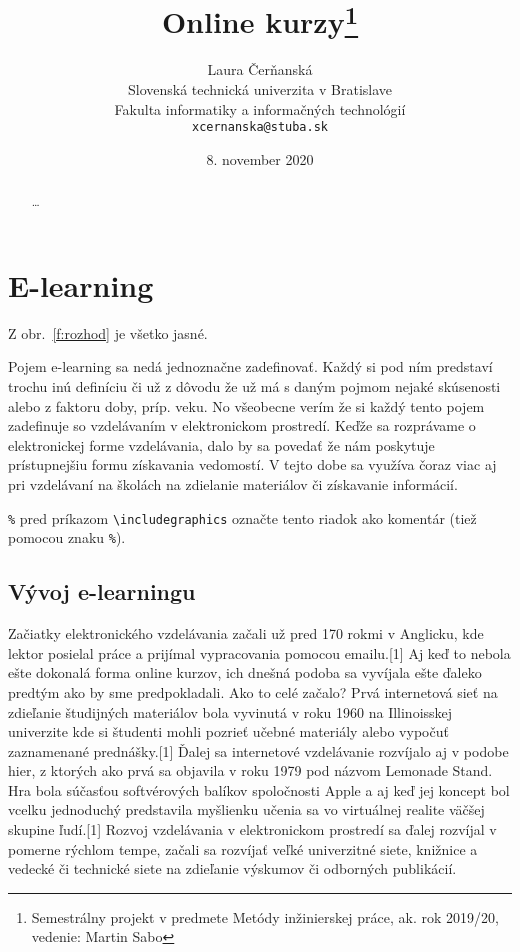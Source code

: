 \documentclass[10pt,twoside,slovak,a4paper]{article}
\title{Online kurzy\thanks{Semestrálny projekt v predmete Metódy inžinierskej práce, ak. rok 2019/20, vedenie: Martin Sabo}}
\author{Laura Čerňanská\\[2pt]
	{\small Slovenská technická univerzita v Bratislave}\\
	{\small Fakulta informatiky a informačných technológií}\\
	{\small \texttt{xcernanska@stuba.sk}}
	}
\date{\small 8. november 2020}
\begin{document}
\maketitle

\begin{abstract}
\ldots
\end{abstract}


\section{E-learning} \label{elearning}

Z obr.~\ref{f:rozhod} je všetko jasné. 

\begin{figure*}[tbh]
\centering
Pojem e-learning sa nedá jednoznačne zadefinovať. Každý si pod ním predstaví trochu inú definíciu či už z dôvodu že už má s daným pojmom nejaké skúsenosti alebo z faktoru doby, príp. veku. No všeobecne verím že si každý tento pojem zadefinuje so vzdelávaním v elektronickom prostredí. Keďže sa rozprávame o elektronickej forme vzdelávania, dalo by sa povedať že nám poskytuje prístupnejšiu formu získavania vedomostí. V tejto dobe sa využíva čoraz viac aj pri vzdelávaní na školách na zdielanie materiálov či získavanie informácií.

\texttt{\%} pred príkazom 
\verb|\includegraphics| označte tento riadok ako komentár (tiež pomocou znaku \texttt{\%}).
\caption{Rozhodujúci argument.}
\label{f:rozhod}
\end{figure*}

\subsection{Vývoj e-learningu} \label{vyvoj}

Začiatky elektronického vzdelávania začali už pred 170 rokmi v Anglicku, kde lektor posielal práce a prijímal vypracovania pomocou emailu.[1] Aj keď to nebola ešte dokonalá forma online kurzov, ich dnešná podoba sa vyvíjala ešte ďaleko predtým ako by sme predpokladali. 
Ako to celé začalo?
Prvá internetová sieť na zdieľanie študijných materiálov bola vyvinutá v roku 1960 na Illinoisskej univerzite kde si študenti mohli pozrieť učebné materiály alebo vypočuť zaznamenané prednášky.[1]
Ďalej sa internetové vzdelávanie rozvíjalo aj v podobe hier, z ktorých ako prvá sa objavila v roku 1979 pod názvom Lemonade Stand. Hra bola súčasťou softvérových balíkov spoločnosti Apple a aj keď jej koncept bol vcelku jednoduchý predstavila myšlienku učenia sa vo virtuálnej realite väčšej skupine ľudí.[1]
Rozvoj vzdelávania v elektronickom prostredí sa ďalej rozvíjal v pomerne rýchlom tempe, začali sa rozvíjať veľké univerzitné siete, knižnice a vedecké či technické siete na zdieľanie výskumov či odborných publikácií.
\end{document}

